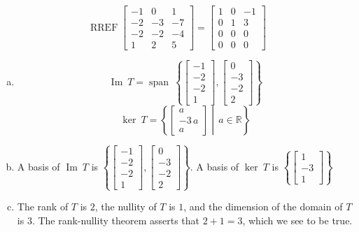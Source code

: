 \begin{exerciseAnswer} 


\[\operatorname{RREF} \left[\begin{array}{ccc}
-1 & 0 & 1 \\
-2 & -3 & -7 \\
-2 & -2 & -4 \\
1 & 2 & 5
\end{array}\right] = \left[\begin{array}{ccc}
1 & 0 & -1 \\
0 & 1 & 3 \\
0 & 0 & 0 \\
0 & 0 & 0
\end{array}\right] \]


\begin{enumerate}[(a)]
\item \[\operatorname{Im}\ T = \operatorname{span}\  \left\{ \left[\begin{array}{c}
-1 \\
-2 \\
-2 \\
1
\end{array}\right] , \left[\begin{array}{c}
0 \\
-3 \\
-2 \\
2
\end{array}\right] \right\} \]\[\operatorname{ker}\ T =  \left\{ \left[\begin{array}{c}
a \\
-3 \, a \\
a
\end{array}\right] \middle|\,a\in\mathbb{R}\right\} \]
\item  A basis of \(\operatorname{Im}\ T\) is \( \left\{ \left[\begin{array}{c}
-1 \\
-2 \\
-2 \\
1
\end{array}\right] , \left[\begin{array}{c}
0 \\
-3 \\
-2 \\
2
\end{array}\right] \right\} \). A basis of \(\operatorname{ker}\ T\) is \( \left\{ \left[\begin{array}{c}
1 \\
-3 \\
1
\end{array}\right] \right\} \)
\item  The rank of \(T\) is \( 2 \), the nullity of \(T\) is \( 1 \), and the dimension of the domain of \(T\) is \( 3 \). The rank-nullity theorem asserts that \( 2 + 1 = 3 \), which we see to be true. 
\end{enumerate}
    
\end{exerciseAnswer}
    
